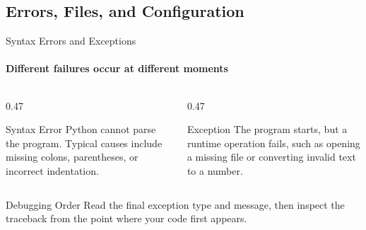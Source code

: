 


\subsection{Errors, Files, and Configuration}

\begin{frame}{Syntax Errors and Exceptions}
\framesubtitle{Different failures occur at different moments}
\begin{columns}[T,onlytextwidth]
\begin{column}{0.47\textwidth}
\begin{block}{Syntax Error}
Python cannot parse the program. Typical causes include missing colons, parentheses, or incorrect indentation.
\end{block}
\end{column}
\hfill
\begin{column}{0.47\textwidth}
\begin{block}{Exception}
The program starts, but a runtime operation fails, such as opening a missing file or converting invalid text to a number.
\end{block}
\end{column}
\end{columns}
\begin{exampleblock}{Debugging Order}
Read the final exception type and message, then inspect the traceback from the point where your code first appears.
\end{exampleblock}
\end{frame}

